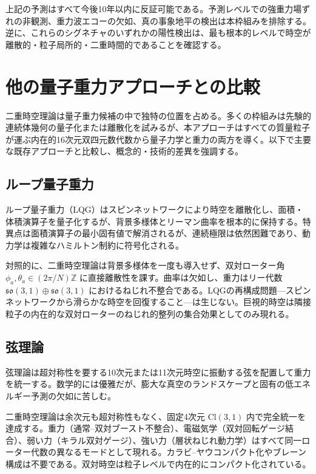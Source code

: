 \documentclass[a4paper]{article}
\begin{document}
上記の予測はすべて今後10年以内に反証可能である。予測レベルでの強重力場ずれの非観測、重力波エコーの欠如、真の事象地平の検出は本枠組みを排除する。逆に、これらのシグネチャのいずれかの陽性検出は、最も根本的レベルで時空が離散的・粒子局所的・二重時間的であることを確認する。

\section{他の量子重力アプローチとの比較}
\label{sec:comparison}

二重時空理論は量子重力候補の中で独特の位置を占める。多くの枠組みは先験的連続体幾何の量子化または離散化を試みるが、本アプローチはすべての質量粒子が運ぶ内在的16次元双四元数代数から量子力学と重力の両方を導く。以下で主要な既存アプローチと比較し、概念的・技術的差異を強調する。

\subsection{ループ量子重力}

ループ量子重力（LQG）はスピンネットワークにより時空を離散化し、面積・体積演算子を量子化するが、背景多様体とリーマン曲率を根本的に保持する。特異点は面積演算子の最小固有値で解消されるが、連続極限は依然困難であり、動力学は複雑なハミルトン制約に符号化される。

対照的に、二重時空理論は背景多様体を一度も導入せず、双対ローター角 $\phi_a, \theta_a \in (2\pi/N)\mathbb{Z}$ に直接離散性を課す。曲率は欠如し、重力はリー代数 $\mathfrak{so}(3,1) \oplus \mathfrak{so}(3,1)$ におけるねじれ不整合である。LQGの再構成問題---スピンネットワークから滑らかな時空を回復すること---は生じない。巨視的時空は隣接粒子の内在的な双対ローターのねじれ的整列の集合効果としてのみ現れる。

\subsection{弦理論}

弦理論は超対称性を要する10次元または11次元時空に振動する弦を配置して重力を統一する。数学的には優雅だが、膨大な真空のランドスケープと固有の低エネルギー予測の欠如に苦しむ。

二重時空理論は余次元も超対称性もなく、固定4次元 $\mathrm{Cl}(3,1)$ 内で完全統一を達成する。重力（通常--双対ブースト不整合）、電磁気学（双対回転ゲージ結合）、弱い力（キラル双対ゲージ）、強い力（層状ねじれ動力学）はすべて同一ローター代数の異なるモードとして現れる。カラビ--ヤウコンパクト化やブレーン構成は不要である。双対時空は粒子レベルで内在的にコンパクト化されている。
\end{document}
